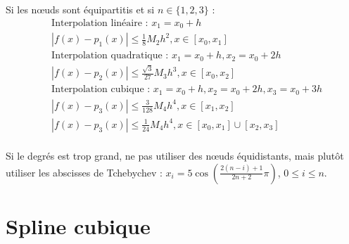 \documentclass[a4paper,9pt]{extarticle}
\begin{document}
\begin{multicols*}{2}
Si les nœuds sont équipartitis et si $n\in\{1,2,3\}$ :
\begin{align*}
&\text{Interpolation linéaire : }x_1=x_0+h \\
&|f(x)-p_1(x)|\leq \frac{1}{8}M_2h^2,x\in [x_0,x_1] \\
&\text{Interpolation quadratique : }x_1=x_0+h,x_2=x_0+2h \\
&|f(x)-p_2(x)|\leq \frac{\sqrt{3}}{27}M_3h^3,x\in [x_0,x_2]\\
&\text{Interpolation cubique : }x_1=x_0+h,x_2=x_0+2h,x_3=x_0+3h \\
&|f(x)-p_3(x)|\leq \frac{3}{128}M_4h^4,x\in[x_1,x_2]\\
&|f(x)-p_3(x)|\leq \frac{1}{24}M_4h^4,x\in[x_0,x_1]\cup[x_2,x_3]\\
\end{align*}

Si le degrés est trop grand, ne pas utiliser des nœuds équidistants, mais plutôt utiliser les abscisses de Tchebychev : $x_i=5\cos(\frac{2(n-i)+1}{2n+2}\pi)$, $0\leq i\leq n$.

\section{Spline cubique}


\end{multicols*}
\end{document}
